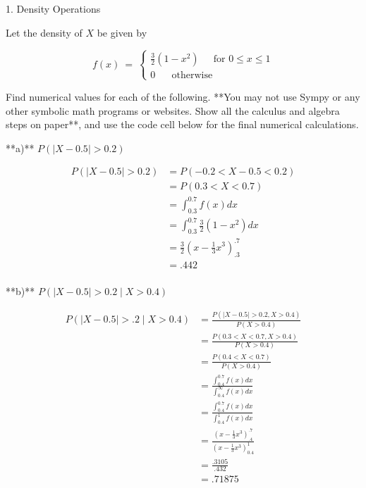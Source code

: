 \documentclass{report}
\title{}
\author{Ryan Lin}
\date{}
\begin{document}
\maketitle
\section{}



 1. Density Operations 

Let the density of $X$ be given by 

$$
f(x) ~ = ~ 
\begin{cases}
\frac{3}{2}(1 - x^2) ~~~~~ \text{ for } 0 \le x \le 1\\
0 ~~~~~~ \text{ otherwise}
\end{cases}
$$

Find numerical values for each of the following. **You may not use Sympy or any other symbolic math programs or websites. Show all the calculus and algebra steps on paper**, and use the code cell below for the final numerical calculations. 

**a)** $P(\vert X - 0.5 \vert > 0.2)$

\begin{align*}
	P(\vert X - 0.5 \vert > 0.2) &= P(-0.2 < X - 0.5 < 0.2) \\
	&= P(0.3 < X < 0.7) \\
	&= \int_{0.3}^{0.7} f(x) dx \\
	&= \int_{0.3}^{0.7} \frac{3}{2}(1-x^{2}) dx \\
	&= \frac{3}{2} \left( x - \frac{1}{3}x^{3} \right)^{.7}_{.3} \\
	&= .442 \\
\end{align*}

**b)** $P(\vert X - 0.5 \vert > 0.2 \mid X > 0.4)$

\begin{align*}
	P(\vert X - 0.5 \vert > .2 \mid X > 0.4) &= \frac{P(\vert X - 0.5 \vert > 0.2, X > 0.4)}{P(X>0.4)} \\
	&= \frac{P(0.3 < X < 0.7, X > 0.4)}{ P(X > 0.4)} \\
	&= \frac{P(0.4 < X < 0.7)}{P(X > 0.4)} \\
	&= \frac{\int_{0.4}^{0.7}f(x)dx}{\int_{0.4}^{\infty }f(x)dx} \\
	&= \frac{\int_{0.4}^{0.7}f(x)dx}{\int_{0.4}^{1}f(x)dx} \\
	&= \frac{\left( x - \frac{1}{3}x^{3} \right)^{.7}_{.4}}{\left( x - \frac{1}{3}x^{3} \right)_{0.4}^{1}} \\
	&= \frac{.3105}{.432} \\
	&= .71875 \\
\end{align*}
\end{document}

